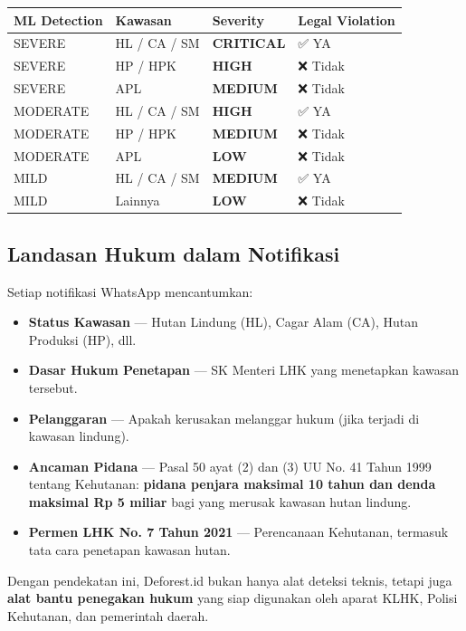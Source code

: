 \documentclass[11pt,a4paper]{article}
\begin{document}
\begin{longtable}{p{3cm} p{3cm} p{3.5cm} p{3.5cm}}
    \toprule
    \textbf{ML Detection} & \textbf{Kawasan} & \textbf{Severity} & \textbf{Legal Violation} \\
    \midrule
    \endhead
    \bottomrule
    \endlastfoot

    SEVERE & HL / CA / SM & \textbf{CRITICAL} & ✅ YA \\
    SEVERE & HP / HPK & \textbf{HIGH} & ❌ Tidak \\
    SEVERE & APL & \textbf{MEDIUM} & ❌ Tidak \\
    MODERATE & HL / CA / SM & \textbf{HIGH} & ✅ YA \\
    MODERATE & HP / HPK & \textbf{MEDIUM} & ❌ Tidak \\
    MODERATE & APL & \textbf{LOW} & ❌ Tidak \\
    MILD & HL / CA / SM & \textbf{MEDIUM} & ✅ YA \\
    MILD & Lainnya & \textbf{LOW} & ❌ Tidak \\

\end{longtable}

\subsection{Landasan Hukum dalam Notifikasi}

Setiap notifikasi WhatsApp mencantumkan:

\begin{itemize}
    \item \textbf{Status Kawasan} --- Hutan Lindung (HL), Cagar Alam (CA), Hutan Produksi (HP), dll.
    \item \textbf{Dasar Hukum Penetapan} --- SK Menteri LHK yang menetapkan kawasan tersebut.
    \item \textbf{Pelanggaran} --- Apakah kerusakan melanggar hukum (jika terjadi di kawasan lindung).
    \item \textbf{Ancaman Pidana} --- Pasal 50 ayat (2) dan (3) UU No. 41 Tahun 1999 tentang Kehutanan: \textbf{pidana penjara maksimal 10 tahun dan denda maksimal Rp 5 miliar} bagi yang merusak kawasan hutan lindung.
    \item \textbf{Permen LHK No. 7 Tahun 2021} --- Perencanaan Kehutanan, termasuk tata cara penetapan kawasan hutan.
\end{itemize}

Dengan pendekatan ini, Deforest.id bukan hanya alat deteksi teknis, tetapi juga \textbf{alat bantu penegakan hukum} yang siap digunakan oleh aparat KLHK, Polisi Kehutanan, dan pemerintah daerah.
\end{document}
